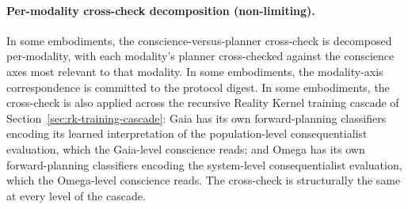 \documentclass[a4paper,12pt]{article}
\newcommand{\RK}{Reality Kernel\xspace}
\begin{document}
\paragraph{Per-modality cross-check decomposition (non-limiting).}
In some embodiments, the conscience-versus-planner cross-check is
decomposed per-modality, with each modality's planner cross-checked
against the conscience axes most relevant to that modality. In some
embodiments, the modality-axis correspondence is committed to the
protocol digest. In some embodiments, the cross-check is also
applied across the recursive \RK training cascade of
Section~\ref{sec:rk-training-cascade}: Gaia has its own
forward-planning classifiers encoding its learned interpretation of
the population-level consequentialist evaluation, which the
Gaia-level conscience reads; and Omega has its own forward-planning
classifiers encoding the system-level consequentialist evaluation,
which the Omega-level conscience reads. The cross-check is
structurally the same at every level of the cascade.
\end{document}
